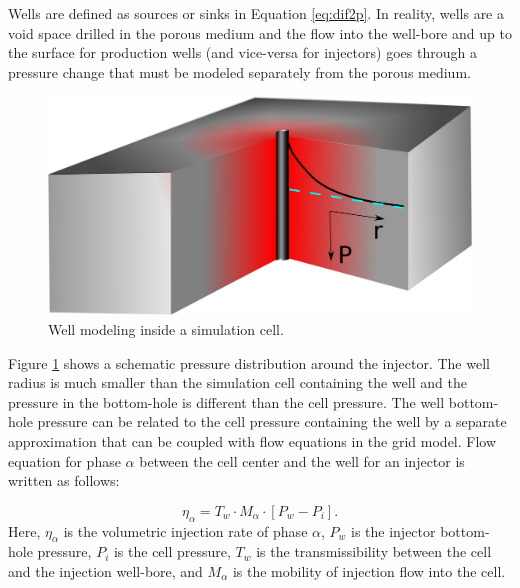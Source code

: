 Wells are defined as sources or sinks in Equation \ref{eq:dif2p}. In reality, wells
are a void space drilled in the porous medium and the flow into the
well-bore and up to the surface for production wells (and vice-versa for injectors)
goes through a pressure change that must be modeled separately from the porous
medium. 


\begin{figure}
 \centering{}
 \includegraphics[width=0.4\linewidth]{./figurer/WModel}
 \caption{Well modeling inside a simulation cell.}
 \label{fig:WM}
\end{figure}

Figure \ref{fig:WM} shows a schematic pressure distribution around the
injector. The well radius is much smaller than the simulation cell containing
the well and the pressure in the bottom-hole is different than the cell
pressure. The well bottom-hole pressure can be related to the cell pressure
containing the well by a separate approximation that can be coupled with flow equations in the grid model. Flow equation for phase $\alpha$ between the
cell center and the well for an injector is written as follows:

\begin{equation}
 \eta_{\alpha}=T_w\cdot M_{\alpha}\cdot [P_w-P_{{i}}].
 \label{eq:WFLW}
\end{equation} Here, $\eta_{\alpha}$ is the volumetric injection rate of phase
$\alpha$, $P_w$ is the injector bottom-hole pressure, $P_{{i}}$ is the
cell pressure, $T_{w}$ is the transmissibility between the cell and the
injection well-bore, and $M_\alpha$ is the mobility of injection flow into the
cell. 

